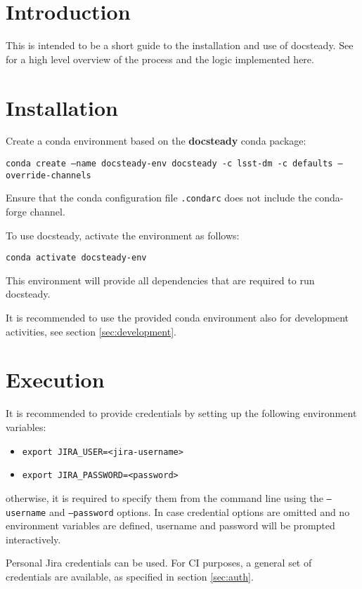 
\section{Introduction}

This is intended to be a short guide to the installation and use of docsteady.
See  for a high level overview of the process and the logic implemented here.


\section{Installation}\label{sec:install}

Create a conda environment based on the \textbf{docsteady} conda package:

\texttt{conda create --name docsteady-env docsteady -c lsst-dm -c defaults --override-channels}

Ensure that the conda configuration file  \texttt{.condarc} does not include the conda-forge channel.

To use docsteady, activate the environment as follows:

\texttt{conda activate docsteady-env}

This environment will provide all dependencies that are required to run docsteady.

It is recommended to use the provided conda environment also for development activities, see section \ref{sec:development}.


\section{Execution}

It is recommended to provide credentials by setting up the following environment variables:

\begin{itemize}
\item \texttt{export JIRA\_USER=<jira-username>}
\item \texttt{export JIRA\_PASSWORD=<password>}
\end{itemize}

otherwise, it is required to specify them from the command line using the \texttt{--username} and \texttt{--password} options.
In case credential options are omitted and no environment variables are defined, username and password will be prompted interactively.

Personal Jira credentials can be used. 
For CI purposes, a general set of credentials are available, as specified in section \ref{sec:auth}.

